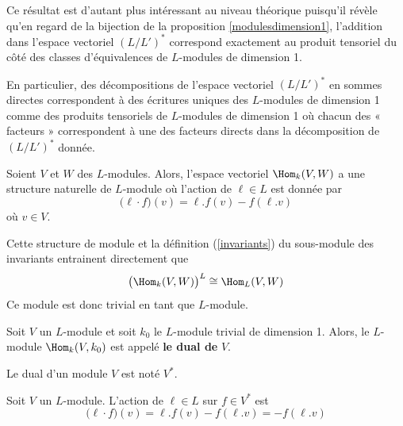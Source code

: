 \begin{Rem} Ce résultat est d'autant plus intéressant au niveau théorique puisqu'il révèle qu'en regard de la bijection de la proposition \ref{modulesdimension1}, l'addition dans l'espace vectoriel $(L/L')^*$ correspond exactement au produit tensoriel du côté des classes d'équivalences de \linebreak $L$-modules de dimension 1.

En particulier, des décompositions de l'espace vectoriel $(L/L')^*$ en sommes directes correspondent à des écritures uniques des $L$-modules de dimension 1 comme des produits tensoriels de $L$-modules de dimension 1 où chacun des « facteurs » correspondent à une des facteurs directs dans la décomposition de $(L/L')^*$ donnée.
\end{Rem}

\begin{Def} Soient $V$ et $W$ des $L$-modules. Alors, l'espace vectoriel $\Hom_k(V,W)$ a une structure naturelle de $L$-module où l'action de $\ell \in L$ est donnée par
\begin{equation} \label{modulehom}
\big(\ell \cdot f\big)(v) = \ell.f(v)-f(\ell.v)
\end{equation}
où $v \in V$.
\end{Def} 

\begin{Rem} \label{invariantshom} Cette structure de module et la définition (\ref{invariants}) du sous-module des invariants entrainent directement que 
$$ \big(\Hom_k(V,W)\big)^L \cong \Hom_L(V,W) $$
Ce module est donc trivial en tant que $L$-module.
\end{Rem}

\begin{Def} Soit $V$ un $L$-module et soit $k_0$ le $L$-module trivial de dimension 1. Alors, le $L$-module $\Hom_k(V,k_0)$ est appelé \textbf{le dual de} $V$. 

Le dual d'un module $V$ est noté $V^*$.
\end{Def}

\begin{Rem} Soit $V$ un $L$-module. L'action de $\ell \in L$ sur $f \in V^*$ est  
$$ \big(\ell \cdot f\big)(v) = \ell.f(v) - f(\ell.v) = - f(\ell.v) $$
\end{Rem}

